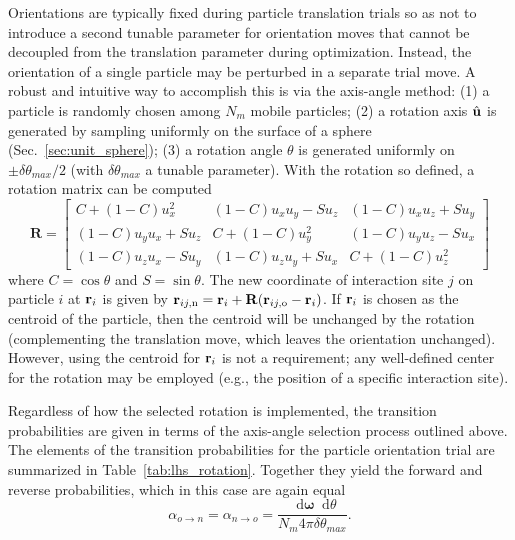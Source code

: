 \documentclass[
  9pt,
  bestpractices,
]{livecoms}
\newcommand*\diff{\mathop{}\!\mathrm{d}}
\begin{document}
Orientations are typically fixed during particle translation trials so as not to introduce a second tunable parameter for orientation moves that cannot be decoupled from the translation parameter during optimization.
Instead, the orientation of a single particle may be perturbed in a separate trial move.
A robust and intuitive way to accomplish this is via the axis-angle method: (1) a particle is randomly chosen among $N_m$ mobile particles; (2) a rotation axis $\hat {\bf u}$ is generated by sampling uniformly on the surface of a sphere (Sec.~\ref{sec:unit_sphere}); (3) a rotation angle $\theta$ is generated uniformly on $\pm\delta\theta_{max}/2$ (with $\delta\theta_{max}$ a tunable parameter).
With the rotation so defined, a rotation matrix can be computed
\begin{equation}
\mathbf{R} =
\begin{bmatrix}
C + (1 - C) u_x^2 & (1 - C) u_x u_y - S u_z & (1 - C) u_x u_z + S u_y \\
(1 - C) u_y u_x + S u_z & C + (1 - C) u_y^2 & (1 - C) u_y u_z - S u_x \\
(1 - C) u_z u_x - S u_y & (1 - C) u_z u_y + S u_x & C + (1 - C) u_z^2
\end{bmatrix}
\label{eq:rotation_matrix}
\end{equation}
where $C =\cos\theta$ and $S = \sin\theta$.
The new coordinate of interaction site $j$ on particle $i$ at ${\bf r}_i$ is given by ${{\bf r}_{ij,{\rm n}}={\bf r}_{i}}+{\mathbf R}({\bf r}_{ij,{\rm o}}-{\bf r}_i)$.
If ${\bf r}_i$ is chosen as the centroid of the particle, then the centroid will be unchanged by the rotation (complementing the translation move, which leaves the orientation unchanged).
However, using the centroid for ${\bf r}_i$ is not a requirement; any well-defined center for the rotation may be employed (e.g., the position of a specific interaction site).


Regardless of how the selected rotation is implemented, the transition probabilities are given in terms of the axis-angle selection process outlined above.
The elements of the transition probabilities for the particle orientation trial are summarized in Table~\ref{tab:lhs_rotation}.
Together they yield the forward and reverse probabilities, which in this case are again equal
\begin{equation}
  \alpha_{o\rightarrow n}=\alpha_{n\rightarrow o} = \frac{\diff\mathbf{\omega}\diff\theta}{N_m 4\pi\delta\theta_{max}}.
\label{eq:lhs_rhs_rot_fwdrev}
\end{equation}
\end{document}

